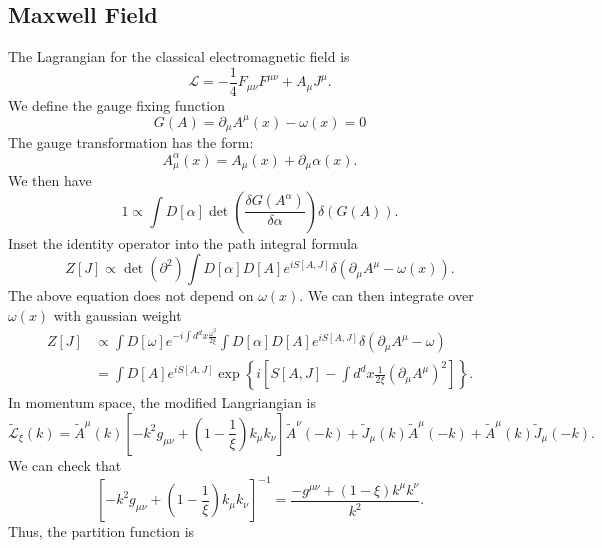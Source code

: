 \subsection{Maxwell Field}
The Lagrangian for the classical electromagnetic field is
\begin{equation}
	\mathcal{L} = -\frac{1}{4}F_{\mu\nu}F^{\mu\nu}+A_\mu J^\mu.
\end{equation}
We define the gauge fixing function
\begin{equation*}
	G(A) = \partial_\mu A^\mu(x) -\omega(x) = 0
\end{equation*}
The gauge transformation has the form:
\begin{equation*}
	A^\alpha_\mu(x) = A_\mu(x) + \partial_\mu \alpha(x).
\end{equation*}
We then have
\begin{equation*}
	1 \propto \int D[\alpha] \det\left(\frac{\delta G(A^\alpha)}{\delta \alpha}\right) \delta(G(A)).
\end{equation*}
Inset the identity operator into the path integral formula
\begin{equation*}
	Z[J] \propto \det\left(\partial^2 \right) \int D[\alpha]D[A] e^{iS[A,J]} \delta(\partial_\mu A^\mu -\omega(x)).
\end{equation*}
The above equation does not depend on $\omega(x)$.
We can then integrate over $\omega(x)$ with gaussian weight
\begin{equation*}
\begin{aligned}
	Z[J] &\propto \int D[\omega] e^{-i\int d^d x \frac{\omega^2}{2\xi}} \int D[\alpha]D[A] e^{iS[A,J]}
	\delta(\partial_\mu A^\mu-\omega) \\
	&= \int D[A] e^{iS[A,J]} \exp\left\{i \left[S[A,J]-\int d^d x \frac{1}{2\xi}(\partial_\mu A^\mu)^2 \right]\right\}.
\end{aligned}
\end{equation*}
In momentum space, the modified Langriangian is 
\begin{equation*}
	\tilde{\mathcal{L}}_\xi(k) = \tilde{A}^\mu(k)\left[
		-k^2 g_{\mu\nu}+\left(1-\frac{1}{\xi}\right)k_\mu k_\nu
		\right] \tilde{A}^\nu(-k) +
		\tilde{J}_\mu(k) \tilde{A}^\mu(-k) +
		\tilde{A}^\mu(k) \tilde{J}_\mu(-k).
\end{equation*}
We can check that
\begin{equation}
	\left[-k^2 g_{\mu\nu}+\left(1-\frac{1}{\xi}\right)k_\mu k_\nu\right]^{-1}
	= \frac{-g^{\mu\nu}+(1-\xi)k^\mu k^\nu}{k^2}.
\end{equation}
Thus, the partition function is
